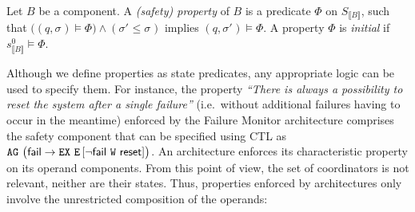 \documentclass{llncs}
\newcommand{\Simon}{\\\hfill\mdash Simon}
\newcommand{\noteSB}[2][color=green!40, size=\tiny]{\todo[#1]{{#2}\Simon}}
\newcommand{\todoSB}[2][color=green!40, size=\tiny]{\todo[#1]{\textbf{To-do Simon:} {#2}}}
\newcommand{\newCoord}[1]{{\color{blue}#1}}
\newcommand{\app}[1]{App.~\ref{secn:#1}}
\newcommand{\mdash}[1][]{---#1}
\newcommand{\ie}[1][\ ]{i.e.#1}
\newcommand{\goesto}[2][]{\ensuremath{\xrightarrow[{#1}\relax]{#2}}}
\newcommand{\true} {\ensuremath{\mathtt{t\!t}}}
\newcommand{\order}{\leqslant}
\newcommand{\val}[3][]{\ensuremath{#1{\sigma}^{#2}_{#3}}}
\newcommand{\AG}[1][\ ]{\ensuremath{\mathtt{AG}#1}}
\newcommand{\EX}[1][\ ]{\ensuremath{\mathtt{EX}#1}}
\newcommand{\EW}[3][\ ]{\ensuremath{\mathtt{E}\left[#2\ \mathtt{W}\ #3\right]#1}}
\newcommand{\primeit}[1]{#1'}
\newcommand{\semclosed}[1]{\ensuremath{\llbracket{#1}\rrbracket}}
\begin{document}
\begin{definition}[Properties]
  \label{defn:property}
  Let $B$ be a component.  A \emph{(safety) property} 
  of $B$ is a predicate $\Phi$ on
  $S_{\semclosed{B}}$, such that $\bigl((q,
  \val{}{}) \models \Phi\bigr) \land (\val[\primeit]{}{} \order
  \val{}{})$ implies $(q, \val[\primeit]{}{}) \models \Phi$.
  A property $\Phi$ is \emph{initial} if
  $s^0_{\semclosed{B}} \models \Phi$.
\end{definition}

\label{property:reset}
Although we define properties as state predicates, any
appropriate logic can be used to specify them.  For instance, the
property \emph{``There is always a possibility to reset the system
  after a single failure''} (\ie without
  additional failures having to occur in the meantime) enforced by the
  Failure Monitor architecture \newCoord{comprises the safety component that} can be specified using CTL as
    $\AG
\bigl(\PortFail \rightarrow \EX \EW[]{\lnot \PortFail}{
  \PortReset}\bigr)$.  %
An architecture enforces
its characteristic property on  its operand components.
From this point of view, the set of coordinators is
not relevant, neither are their states.  Thus, 
properties enforced by architectures only involve
the unrestricted composition of the operands:
\end{document}
